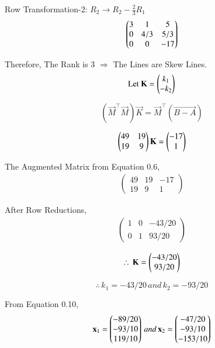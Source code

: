 \documentclass[journal]{IEEEtran}
\begin{document}
Row Transformation-2: $R_2 \rightarrow R_2 - \frac{2}{3}R_1$
\begin{equation}
    \begin{pmatrix}3 & 1 & 5 \\ 0 & 4/3 & 5/3 \\ 0 & 0 & -17\end{pmatrix}
\end{equation}

Therefore, The Rank is 3 $\Rightarrow$ The Lines are Skew Lines.\\

\begin{equation}
\text{Let } \mathbf{K} = \begin{pmatrix}k_1 \\ -k_2\end{pmatrix}   
\end{equation}

\begin{equation}
    (\vec{M}^\top\vec{M})\vec{K}=\vec{M}^\top(\vec{B-A})
\end{equation}

\begin{equation}
    \begin{pmatrix}49 & 19 \\ 19 & 9\end{pmatrix}\mathbf{K} = \begin{pmatrix}-17 \\ 1\end{pmatrix}
\end{equation}

The Augmented Matrix from Equation 0.6,\\
\begin{align}
\left(
\begin{array}{cc|c}
         49 & 19 & -17 \\
         19 & 9 & 1
\end{array}
\right)
\end{align}

After Row Reductions,
\begin{align}
\left(
\begin{array}{cc|c}
         1 & 0 & -43/20 \\
         0 & 1 & 93/20
\end{array}
\right)
\end{align}

\begin{equation}
    \therefore \, \mathbf{K} = \begin{pmatrix}-43/20 \\ 93/20\end{pmatrix}
\end{equation}

\begin{equation}
\therefore \, k_1 = -43/20 \, and \, k_2 = -93/20    
\end{equation}

From Equation 0.10,
\begin{align}
    \mathbf{x}_1 = \begin{pmatrix}-89/20 \\ -93/10 \\ 119/10\end{pmatrix} \, and \, \mathbf{x}_2 =\begin{pmatrix}-47/20 \\ -93/10 \\ -153/10\end{pmatrix}
\end{align}
\end{document}
